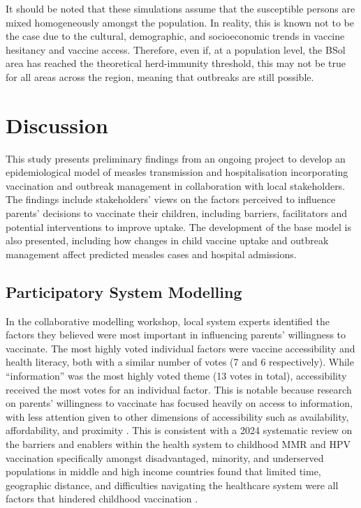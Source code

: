 \documentclass[12pt]{article}
\begin{document}
It should be noted that these simulations assume that the susceptible persons are mixed homogeneously amongst the population. In reality, this is known not to be the case due to the cultural, demographic, and socioeconomic trends in vaccine hesitancy and vaccine access. Therefore, even if, at a population level, the BSol area has reached the theoretical herd-immunity threshold, this may not be true for all areas across the region, meaning that outbreaks are still possible.

\section{Discussion}


This study presents preliminary findings from an ongoing project to develop an epidemiological model of measles transmission and hospitalisation incorporating vaccination and outbreak management in collaboration with local stakeholders. The findings include stakeholders' views on the factors perceived to influence parents' decisions to vaccinate their children, including barriers, facilitators and potential interventions to improve uptake. The development of the base model is also presented, including how changes in child vaccine uptake and outbreak management affect predicted measles cases and hospital admissions.

\subsection{Participatory System Modelling}


In the collaborative modelling workshop, local system experts identified the factors they believed were most important in influencing parents’ willingness to vaccinate. The most highly voted individual factors were vaccine accessibility and health literacy, both with a similar number of votes (7 and 6 respectively). While ``information'' was the most highly voted theme (13 votes in total), accessibility received the most votes for an individual factor. This is notable because research on parents' willingness to vaccinate has focused heavily on access to information, with less attention given to other dimensions of accessibility such as availability, affordability, and proximity \cite{chisnall2024parents}. This is consistent with a 2024 systematic review on the barriers and enablers within the health system to childhood MMR and HPV vaccination specifically amongst disadvantaged, minority, and underserved populations in middle and high income countries found that limited time, geographic distance, and difficulties navigating the healthcare system were all factors that hindered childhood vaccination \cite{essa2024understanding}.
\end{document}
